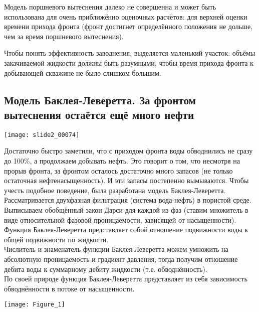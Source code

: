 \documentclass[main.tex]{subfiles}
\begin{document}
Модель поршневого вытеснения далеко не совершенна и может быть использована для очень приближённо оценочных расчётов: для верхней оценки времени прихода фронта (фронт достигнет определённого положения не дольше, чем за время поршневого вытеснения).

Чтобы понять эффективность заводнения, выделяется маленький участок: объёмы закачиваемой жидкости должны быть разумными, чтобы время прихода фронта к добывающей скважине не было слишком большим.


\subsection{Модель Баклея-Леверетта. За фронтом вытеснения остаётся ещё много нефти}

\texttt{[image: slide2\_00074]}

Достаточно быстро заметили, что с приходом фронта воды обводнились не сразу до 100\%, а продолжаем добывать нефть. Это говорит о том, что несмотря на прорыв фронта, за фронтом осталось достаточно много запасов (не только остаточная нефтенасыщенность). И эти запасы постепенно вымываются. Чтобы учесть подобное поведение, была разработана модель Баклея-Леверетта.\\

Рассматривается двухфазная фильтрация (система вода-нефть) в пористой среде. Выписываем обобщённый закон Дарси для каждой из фаз (ставим множитель в виде относительной фазовой проницаемости, зависящей от насыщенности).\\

Функция Баклея-Леверетта представляет собой отношение подвижности воды к общей подвижности по жидкости.\\

Числитель и знаменатель функции Баклея-Леверетта можем умножить на абсолютную проницаемость и градиент давления, тогда получим отношение дебита воды к суммарному дебиту жидкости (т.е. обводнённость).\\

По своей природе функция Баклея-Леверетта представляет из себя зависимость обводнённости в потоке от насыщенности.


\begin{center}
\texttt{[image: Figure\_1]}
\end{center}
\end{document}
